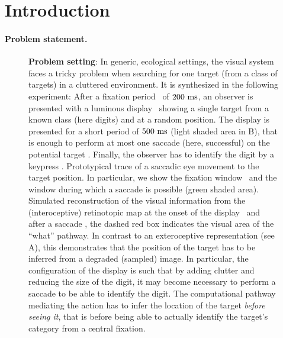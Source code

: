\section{Introduction}
\label{sec:intro}
\ICANN
\paragraph{Problem statement.}
\fi
\begin{figure}[b!]%
	\caption{%
		{\bf Problem setting}: In generic, ecological settings, the visual system faces a tricky problem when searching for one target (from a class of targets) in a cluttered environment. It is synthesized in the following experiment: %
		\A After a fixation period \FIX\ of $200~\si{\milli\second}$, an observer is presented with a luminous display \DIS\ showing a single target from a known class (here digits) and at a random position. The display is presented for a short period of $500~\si{\milli\second}$ (light shaded area in B), that is enough to perform at most one saccade (here, successful) on the potential target \SAC . Finally, the observer has to identify the digit by a keypress \ANS . %
		\B Prototypical trace of a saccadic eye movement to the target position. In particular, we show the fixation window \FIX\ and the window during which a saccade is possible (green shaded area). %
		\C Simulated reconstruction of the visual information from the (interoceptive) retinotopic map at the onset of the display \DIS\ and after a saccade \SAC , the dashed red box indicates the visual area of the ``what'' pathway. In contrast to an exteroceptive representation (see A), this demonstrates that the position of the target has to be inferred from a degraded (sampled) image. In particular, the configuration of the display is such that by adding clutter and reducing the size of the digit, it may become necessary to perform a saccade to be able to identify the digit. The computational pathway mediating the action has to infer the location of the target \emph{before seeing it}, that is before being able to actually identify the target's category from a central fixation. %
		\label{fig:intro}}%
\end{figure}%

